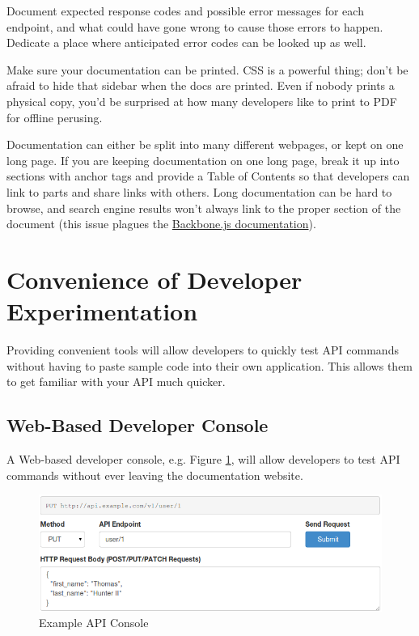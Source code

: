 \documentclass{book}
\begin{document}
Document expected response codes and possible error messages for each endpoint, and what could have gone wrong to cause those errors to happen. Dedicate a place where anticipated error codes can be looked up as well.

Make sure your documentation can be printed. CSS is a powerful thing; don't be afraid to hide that sidebar when the docs are printed. Even if nobody prints a physical copy, you'd be surprised at how many developers like to print to PDF for offline perusing.

Documentation can either be split into many different webpages, or kept on one long page. If you are keeping documentation on one long page, break it up into sections with anchor tags and provide a Table of Contents so that developers can link to parts and share links with others. Long documentation can be hard to browse, and search engine results won't always link to the proper section of the document (this issue plagues the \href{http://backbonejs.org/}{Backbone.js documentation}).


\section{Convenience of Developer Experimentation}

Providing convenient tools will allow developers to quickly test API commands without having to paste sample code into their own application. This allows them to get familiar with your API much quicker.

\subsection{Web-Based Developer Console}

A Web-based developer console, e.g. Figure \ref{fig:devconsole}, will allow developers to test API commands without ever leaving the documentation website.

\begin{figure}[ht!]
\centering
\includegraphics[width=140mm]{images/api-console.png}
\caption{Example API Console}
\label{fig:devconsole}
\end{figure}
\end{document}
